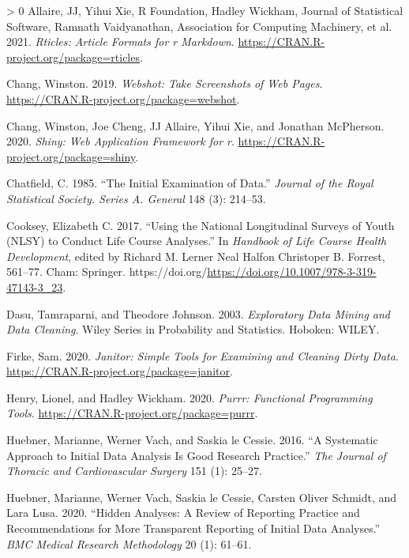 \documentclass{article}
\newlength{\cslhangindent}
\newenvironment{CSLReferences}[3] %
 {%
  \setlength{\parindent}{0pt}
  \ifodd #1 \everypar{\setlength{\hangindent}{\cslhangindent}}\ignorespaces\fi
  \ifnum #2 > 0
  \setlength{\parskip}{#2\baselineskip}
  \fi
 }%
 {}
\begin{document}
\hypertarget{refs}{}
\begin{CSLReferences}{1}{0}
\leavevmode\hypertarget{ref-rticles}{}%
Allaire, JJ, Yihui Xie, R Foundation, Hadley Wickham, Journal of Statistical Software, Ramnath Vaidyanathan, Association for Computing Machinery, et al. 2021. \emph{Rticles: Article Formats for r Markdown}. \url{https://CRAN.R-project.org/package=rticles}.

\leavevmode\hypertarget{ref-webshot}{}%
Chang, Winston. 2019. \emph{Webshot: Take Screenshots of Web Pages}. \url{https://CRAN.R-project.org/package=webshot}.

\leavevmode\hypertarget{ref-shiny}{}%
Chang, Winston, Joe Cheng, JJ Allaire, Yihui Xie, and Jonathan McPherson. 2020. \emph{Shiny: Web Application Framework for r}. \url{https://CRAN.R-project.org/package=shiny}.

\leavevmode\hypertarget{ref-Chatfield1985TIEo}{}%
Chatfield, C. 1985. {``The Initial Examination of Data.''} \emph{Journal of the Royal Statistical Society. Series A. General} 148 (3): 214--53.

\leavevmode\hypertarget{ref-eliznlsy}{}%
Cooksey, Elizabeth C. 2017. {``Using the National Longitudinal Surveys of Youth (NLSY) to Conduct Life Course Analyses.''} In \emph{Handbook of Life Course Health Development}, edited by Richard M. Lerner Neal Halfon Christoper B. Forrest, 561--77. Cham: Springer. https://doi.org/\url{https://doi.org/10.1007/978-3-319-47143-3_23}.

\leavevmode\hypertarget{ref-DasuTamraparni2003Edma}{}%
Dasu, Tamraparni, and Theodore Johnson. 2003. \emph{Exploratory Data Mining and Data Cleaning}. Wiley Series in Probability and Statistics. Hoboken: WILEY.

\leavevmode\hypertarget{ref-janitor}{}%
Firke, Sam. 2020. \emph{Janitor: Simple Tools for Examining and Cleaning Dirty Data}. \url{https://CRAN.R-project.org/package=janitor}.

\leavevmode\hypertarget{ref-purrr}{}%
Henry, Lionel, and Hadley Wickham. 2020. \emph{Purrr: Functional Programming Tools}. \url{https://CRAN.R-project.org/package=purrr}.

\leavevmode\hypertarget{ref-HuebnerMariannePhD2016Asat}{}%
Huebner, Marianne, Werner Vach, and Saskia le Cessie. 2016. {``A Systematic Approach to Initial Data Analysis Is Good Research Practice.''} \emph{The Journal of Thoracic and Cardiovascular Surgery} 151 (1): 25--27.

\leavevmode\hypertarget{ref-HuebnerMarianne2020Haar}{}%
Huebner, Marianne, Werner Vach, Saskia le Cessie, Carsten Oliver Schmidt, and Lara Lusa. 2020. {``Hidden Analyses: A Review of Reporting Practice and Recommendations for More Transparent Reporting of Initial Data Analyses.''} \emph{BMC Medical Research Methodology} 20 (1): 61--61.


\end{CSLReferences}
\end{document}
